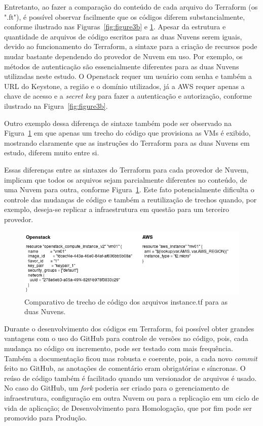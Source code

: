 \documentclass[12pt]{article}
\begin{document}
	Entretanto, ao fazer a comparação do conteúdo de cada arquivo do Terraform (os ".ft"), é possível observar facilmente que os códigos diferem substancialmente, conforme ilustrado nas Figuras~\ref{fig:figure3b} e \ref{fig:figure3}. Apesar da estrutura e quantidade de arquivos de código escritos para as duas Nuvens serem iguais, devido ao funcionamento do Terraform, a sintaxe para a criação de recursos pode mudar bastante dependendo do provedor de Nuvem em uso. Por exemplo, os métodos de autenticação são essencialmente diferentes para as duas Nuvens utilizadas neste estudo. O Openstack requer um usuário com senha e também a URL do Keystone, a região e o domínio utilizados, já a AWS requer apenas a chave de acesso e a \textit{secret key} para fazer a autenticação e autorização, conforme ilustrado na Figura~\ref{fig:figure3b}. 
	
	Outro exemplo dessa diferença de sintaxe também pode ser observado na Figura~\ref{fig:figure3} em que apenas um trecho do código que provisiona as VMs é exibido, mostrando claramente que as instruções do Terraform para as duas Nuvens em estudo, diferem muito entre si.
	
	Essas diferenças entre as sintaxes do Terraform para cada provedor de Nuvem, implicam que todos os arquivos sejam parcialmente diferentes no conteúdo, de uma Nuvem para outra, conforme Figura~\ref{fig:figure3}. Este fato potencialmente dificulta o controle das mudanças de código e também a reutilização de trechos quando, por exemplo, deseja-se replicar a infraestrutura em questão para um terceiro provedor.
		
	\begin{figure}[ht]
		\centering
		\includegraphics[width=0.97\linewidth]{figuras/Figure3.png}
		\caption{Comparativo de trecho de código dos arquivos instance.tf para as duas Nuvens.}
		\label{fig:figure3}
	\end{figure}

	Durante o desenvolvimento dos códigos em Terraform, foi possível obter grandes vantagens com o uso do GitHub para controle de versões no código, pois, cada mudança no código ou incremento, pode ser testado com mais frequência. Também a documentação ficou mas robusta e coerente, pois, a cada novo \textit{commit} feito no GitHub, as anotações de comentário eram obrigatórias e síncronas. O reúso de código também é facilitado quando um versionador de arquivos é usado. No caso do GitHub, um \textit{fork} poderia ser criado para o gerenciamento de infraestrutura, configuração em outra Nuvem ou para a replicação em um ciclo de vida de aplicação; de Desenvolvimento para Homologação, que por fim pode ser promovido para Produção.
	
\end{document}
